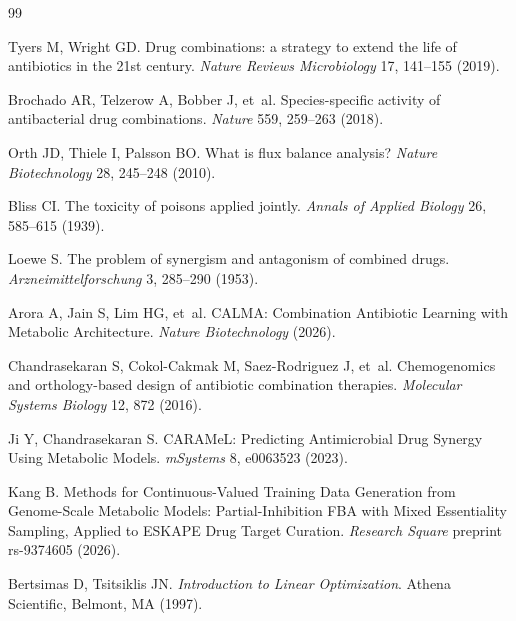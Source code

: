 \documentclass[12pt,a4paper]{article}
\begin{document}
\begin{thebibliography}{99}

Tyers M, Wright GD.
\newblock Drug combinations: a strategy to extend the life of antibiotics in the 21st century.
\newblock \textit{Nature Reviews Microbiology} 17, 141--155 (2019).

Brochado AR, Telzerow A, Bobber J, et~al.
\newblock Species-specific activity of antibacterial drug combinations.
\newblock \textit{Nature} 559, 259--263 (2018).

Orth JD, Thiele I, Palsson BO.
\newblock What is flux balance analysis?
\newblock \textit{Nature Biotechnology} 28, 245--248 (2010).

Bliss CI.
\newblock The toxicity of poisons applied jointly.
\newblock \textit{Annals of Applied Biology} 26, 585--615 (1939).

Loewe S.
\newblock The problem of synergism and antagonism of combined drugs.
\newblock \textit{Arzneimittelforschung} 3, 285--290 (1953).

Arora A, Jain S, Lim HG, et~al.
\newblock CALMA: Combination Antibiotic Learning with Metabolic Architecture.
\newblock \textit{Nature Biotechnology} (2026).

Chandrasekaran S, Cokol-Cakmak M, Saez-Rodriguez J, et~al.
\newblock Chemogenomics and orthology-based design of antibiotic combination therapies.
\newblock \textit{Molecular Systems Biology} 12, 872 (2016).

Ji Y, Chandrasekaran S.
\newblock CARAMeL: Predicting Antimicrobial Drug Synergy Using Metabolic Models.
\newblock \textit{mSystems} 8, e0063523 (2023).

Kang B.
\newblock Methods for Continuous-Valued Training Data Generation from Genome-Scale Metabolic Models: Partial-Inhibition FBA with Mixed Essentiality Sampling, Applied to ESKAPE Drug Target Curation.
\newblock \textit{Research Square} preprint rs-9374605 (2026).

Bertsimas D, Tsitsiklis JN.
\newblock \textit{Introduction to Linear Optimization}.
\newblock Athena Scientific, Belmont, MA (1997).


\end{thebibliography}
\end{document}
